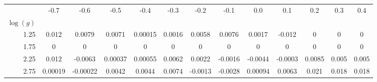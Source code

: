 \begin{tabular}{r|cccccccccccc}
\hline\hline
[Mg/H] & -0.7 & -0.6 & -0.5 & -0.4 & -0.3 & -0.2 & -0.1 & 0.0 & 0.1 & 0.2 & 0.3 & 0.4 \\
$\log(g)$ &  &  &  &  &  &  &  &  &  &  &  &  \\
\hline
1.25 & 0.012 & 0.0079 & 0.0071 & 0.00015 & 0.0016 & 0.0058 & 0.0076 & 0.0017 & -0.012 & 0 & 0 & 0 \\
1.75 & 0 & 0 & 0 & 0 & 0 & 0 & 0 & 0 & 0 & 0 & 0 & 0 \\
2.25 & 0.012 & -0.0063 & 0.00037 & 0.00055 & 0.0062 & 0.0022 & -0.0016 & -0.0044 & -0.0003 & 0.0085 & 0.005 & 0.005 \\
2.75 & 0.00019 & -0.00022 & 0.0042 & 0.0044 & 0.0074 & -0.0013 & -0.0028 & 0.00094 & 0.0063 & 0.021 & 0.018 & 0.018 \\
\hline
\end{tabular}
